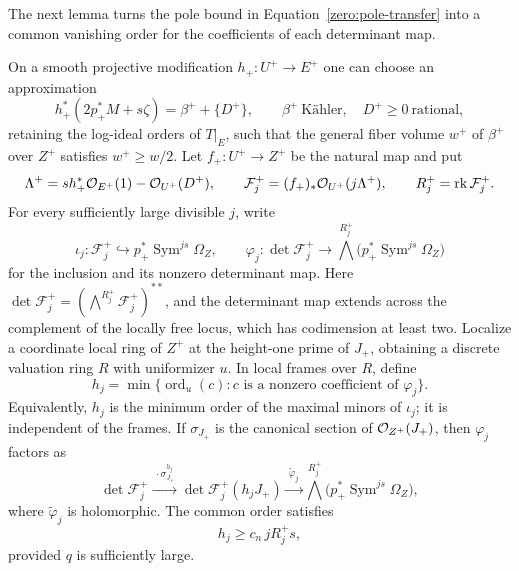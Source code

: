 The next lemma turns the pole bound in
Equation~\eqref{zero:pole-transfer} into a common vanishing order for the
coefficients of each determinant map.

\begin{lemma}\label{zero:determinant-order}
On a smooth projective modification \(h_+:U^+\to E^+\) one can choose
an approximation
\begin{equation}\label{zero:plus-decomposition}
 h_+^*(2p_+^*M+s\zeta)=\beta^++\{D^+\},
 \qquad \beta^+\ \text{Kähler},\quad D^+\ge0\ \text{rational},
\end{equation}
retaining the log-ideal orders of \(T|_E\), such that the general
fiber volume \(w^+\) of \(\beta^+\) over \(Z^+\) satisfies
\(w^+\ge w/2\).  Let \(f_+:U^+\to Z^+\) be the natural map and put
\[
 \Lambda^+=s h_+^*\mathcal O_{E^+}(1)-\mathcal O_{U^+}(D^+),\qquad
 \mathcal F_j^+=(f_+)_*\mathcal O_{U^+}(j\Lambda^+),\qquad
 R_j^+=\operatorname{rk}\mathcal F_j^+ .
\]
For every sufficiently large divisible \(j\), write
\[
 \iota_j:\mathcal F_j^+\hookrightarrow p_+^*\operatorname{Sym}^{js}\Omega_Z,\qquad
 \varphi_j:\det\mathcal F_j^+\longrightarrow
       \bigwedge^{R_j^+}\!\bigl(p_+^*\operatorname{Sym}^{js}\Omega_Z\bigr)
\]
for the inclusion and its nonzero determinant map.  Here
\(\det\mathcal F_j^+=(\bigwedge^{R_j^+}\mathcal F_j^+)^{**}\), and the
determinant map extends across the complement of the locally free locus,
which has codimension at least two.
Localize a coordinate local ring of \(Z^+\) at the height-one prime of
\(J_+\), obtaining a discrete valuation ring \(R\) with uniformizer \(u\).
In local frames over \(R\), define
\[
 h_j=\min\{\operatorname{ord}_u(c):c\text{ is a nonzero coefficient of }\varphi_j\}.
\]
Equivalently, \(h_j\) is the minimum order of the maximal minors of
\(\iota_j\); it is independent of the frames.  If \(\sigma_{J_+}\) is the
canonical section of \(\mathcal O_{Z^+}(J_+)\), then \(\varphi_j\) factors as
\[
 \det\mathcal F_j^+
 \xrightarrow{\ \cdot\sigma_{J_+}^{h_j}\ }
 \det\mathcal F_j^+(h_jJ_+)
 \xrightarrow{\ \widetilde\varphi_j\ }
 \bigwedge^{R_j^+}\!\bigl(p_+^*\operatorname{Sym}^{js}\Omega_Z\bigr),
\]
where \(\widetilde\varphi_j\) is holomorphic.  The common order satisfies
\begin{equation}\label{zero:determinant-order-equation}
 h_j\ge c_n\,jR_j^+s ,
\end{equation}
provided \(q\) is sufficiently large.
\end{lemma}


